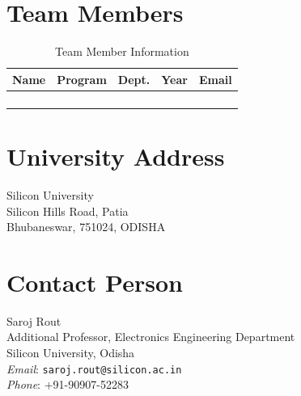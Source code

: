\documentclass[12pt]{article}
\begin{document}
\section{Team Members}
\begin{table}[h]
    \centering
    \begin{tabular}{|c|c|c|c|c|}
        \hline
        \textbf{Name} & \textbf{Program} & \textbf{Dept.} & \textbf{Year} & \textbf{Email} \\ \hline\hline
        & & & & \\ \hline
        & & & & \\ \hline
        & & & & \\ \hline
        & & & & \\ \hline
    \end{tabular}
    \caption{Team Member Information}
    \label{tab:student_info}
\end{table}

\section{University Address}
Silicon University \\
Silicon Hills Road, Patia \\
Bhubaneswar, 751024, ODISHA

\section{Contact Person}

Saroj Rout \\
Additional Professor, Electronics Engineering Department \\
Silicon University, Odisha \\
\textit{Email}: \texttt{saroj.rout@silicon.ac.in} \\
\textit{Phone}: +91-90907-52283 \\




\end{document}

